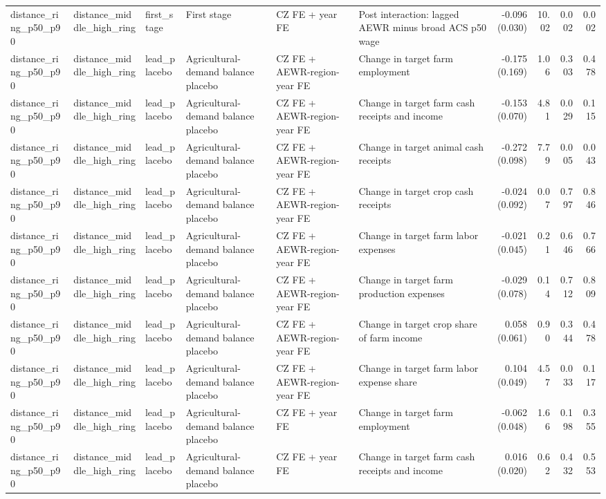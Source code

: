 \begin{tabular}{llllllrrrr}
distance_ring_p50_p90 & distance_middle_high_ring & first_stage & First stage & CZ FE + year FE & Post interaction: lagged AEWR minus broad ACS p50 wage & -0.096 (0.030) & 10.02 & 0.002 & 0.002 \\
distance_ring_p50_p90 & distance_middle_high_ring & lead_placebo & Agricultural-demand balance placebo & CZ FE + AEWR-region-year FE & Change in target farm employment & -0.175 (0.169) & 1.06 & 0.303 & 0.478 \\
distance_ring_p50_p90 & distance_middle_high_ring & lead_placebo & Agricultural-demand balance placebo & CZ FE + AEWR-region-year FE & Change in target farm cash receipts and income & -0.153 (0.070) & 4.81 & 0.029 & 0.115 \\
distance_ring_p50_p90 & distance_middle_high_ring & lead_placebo & Agricultural-demand balance placebo & CZ FE + AEWR-region-year FE & Change in target animal cash receipts & -0.272 (0.098) & 7.79 & 0.005 & 0.043 \\
distance_ring_p50_p90 & distance_middle_high_ring & lead_placebo & Agricultural-demand balance placebo & CZ FE + AEWR-region-year FE & Change in target crop cash receipts & -0.024 (0.092) & 0.07 & 0.797 & 0.846 \\
distance_ring_p50_p90 & distance_middle_high_ring & lead_placebo & Agricultural-demand balance placebo & CZ FE + AEWR-region-year FE & Change in target farm labor expenses & -0.021 (0.045) & 0.21 & 0.646 & 0.766 \\
distance_ring_p50_p90 & distance_middle_high_ring & lead_placebo & Agricultural-demand balance placebo & CZ FE + AEWR-region-year FE & Change in target farm production expenses & -0.029 (0.078) & 0.14 & 0.712 & 0.809 \\
distance_ring_p50_p90 & distance_middle_high_ring & lead_placebo & Agricultural-demand balance placebo & CZ FE + AEWR-region-year FE & Change in target crop share of farm income & 0.058 (0.061) & 0.90 & 0.344 & 0.478 \\
distance_ring_p50_p90 & distance_middle_high_ring & lead_placebo & Agricultural-demand balance placebo & CZ FE + AEWR-region-year FE & Change in target farm labor expense share & 0.104 (0.049) & 4.57 & 0.033 & 0.117 \\
distance_ring_p50_p90 & distance_middle_high_ring & lead_placebo & Agricultural-demand balance placebo & CZ FE + year FE & Change in target farm employment & -0.062 (0.048) & 1.66 & 0.198 & 0.355 \\
distance_ring_p50_p90 & distance_middle_high_ring & lead_placebo & Agricultural-demand balance placebo & CZ FE + year FE & Change in target farm cash receipts and income & 0.016 (0.020) & 0.62 & 0.432 & 0.553 \\

\end{tabular}
